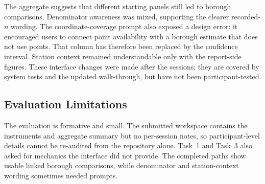 The aggregate suggests that different starting panels still led to borough comparisons. Denominator awareness was mixed, supporting the clearer recorded-$n$ wording. The coordinate-coverage prompt also exposed a design error: it encouraged users to connect point availability with a borough estimate that does not use points. That column has therefore been replaced by the confidence interval. Station context remained understandable only with the report-side figures. These interface changes were made after the sessions; they are covered by system tests and the updated walk-through, but have not been participant-tested.

\subsection{Evaluation Limitations}

The evaluation is formative and small. The submitted workspace contains the instruments and aggregate summary but no per-session notes, so participant-level details cannot be re-audited from the repository alone. Task~1 and Task~3 also asked for mechanics the interface did not provide. The completed paths show usable linked borough comparisons, while denominator and station-context wording sometimes needed prompts.
